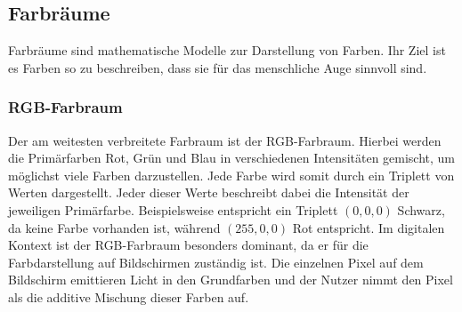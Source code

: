 \subsection{Farbräume}
Farbräume sind mathematische Modelle zur Darstellung von Farben. Ihr Ziel ist es Farben so zu beschreiben, dass sie für das menschliche Auge
sinnvoll sind.

\subsubsection{RGB-Farbraum}
Der am weitesten verbreitete Farbraum ist der RGB-Farbraum. Hierbei werden die Primärfarben Rot, Grün und Blau in verschiedenen
Intensitäten gemischt, um möglichst viele Farben darzustellen. Jede Farbe wird somit durch ein Triplett von Werten dargestellt.
Jeder dieser Werte beschreibt dabei die Intensität der jeweiligen Primärfarbe. Beispielsweise entspricht ein Triplett
\((0,0,0)\) Schwarz, da keine Farbe vorhanden ist, während \((255,0,0)\) Rot entspricht.
Im digitalen Kontext ist der RGB-Farbraum besonders dominant, da er für die Farbdarstellung auf Bildschirmen zuständig ist.
Die einzelnen Pixel auf dem Bildschirm emittieren Licht in den Grundfarben und der Nutzer nimmt den Pixel als die additive Mischung dieser 
Farben auf.~\cite{Vladimir_Chernov_2023_sciencedirect}

